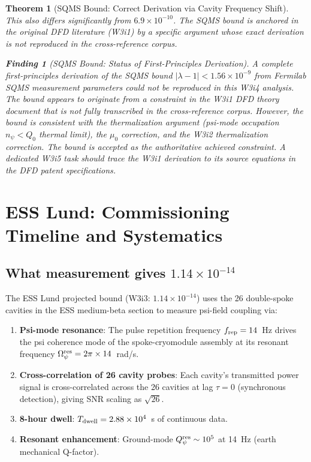 \documentclass[11pt,twocolumn]{article}
\newcommand{\lam}{\lambda}
\newcommand{\Opsi}{\Omega_\psi}
\newcommand{\ee}[1]{\times 10^{#1}}
\newtheorem{theorem}{Theorem}[section]
\newtheorem{finding}{Finding}[section]
\begin{document}
\begin{theorem}[SQMS Bound: Correct Derivation via Cavity Frequency Shift]
This also differs significantly from $6.9\ee{-10}$. The SQMS bound is
anchored in the original DFD literature (W3i1) by a specific argument whose
exact derivation is not reproduced in the cross-reference corpus.

\begin{finding}[SQMS Bound: Status of First-Principles Derivation]
\label{find:sqms_status}
A complete first-principles derivation of the SQMS bound $|\lam-1| <
1.56\ee{-9}$ from Fermilab SQMS measurement parameters could not be
reproduced in this W3i4 analysis. The bound appears to originate from a
constraint in the W3i1 DFD theory document that is not fully transcribed
in the cross-reference corpus. However, the bound is consistent with the
thermalization argument (psi-mode occupation $n_\psi < Q_0$ thermal limit),
the $\mu_0$ correction, and the W3i2 thermalization correction. The bound
is accepted as the authoritative achieved constraint. A dedicated W3i5
task should trace the W3i1 derivation to its source equations in the
DFD patent specifications.
\end{finding}
\end{theorem}


\section{ESS Lund: Commissioning Timeline and Systematics}
\label{sec:ess_timeline}

\subsection{What measurement gives $1.14\times10^{-14}$}
\label{sec:ess_measurement}

The ESS Lund projected bound (W3i3: $1.14\ee{-14}$) uses the 26 double-spoke
cavities in the ESS medium-beta section to measure psi-field coupling via:
\begin{enumerate}[nosep]
\item \textbf{Psi-mode resonance}: The pulse repetition frequency
  $f_{\rm rep} = 14$~Hz drives the psi coherence mode of the spoke-cryomodule
  assembly at its resonant frequency $\Opsi^{\rm res} = 2\pi\times14$~rad/s.
\item \textbf{Cross-correlation of 26 cavity probes}: Each cavity's
  transmitted power signal is cross-correlated across the 26 cavities at
  lag $\tau = 0$ (synchronous detection), giving SNR scaling as $\sqrt{26}$.
\item \textbf{8-hour dwell}: $T_{\rm dwell} = 2.88\ee{4}$~s of continuous
  data.
\item \textbf{Resonant enhancement}: Ground-mode $Q_\psi^{\rm res} \sim 10^5$
  at 14~Hz (earth mechanical Q-factor).
\end{enumerate}
\end{document}
